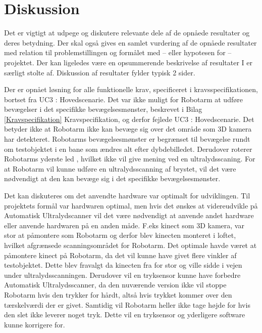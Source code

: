 \chapter{Diskussion}\label{kapitel_Diskussion}
Det er vigtigt at udpege og diskutere relevante dele af de opnåede resultater og deres betydning. Der skal også gives en samlet vurdering af de opnåede resultater med relation til problemstillingen og formålet med – eller hypotesen for – projektet. Der kan ligeledes være en opsummerende beskrivelse af resultater I er særligt stolte af. Diskussion af resultater fylder typisk 2 sider.

Der er opnået løsning for alle funktionelle krav, specificeret i kravsspecifikationen, bortset fra UC3 : Hovedscenarie. Det var ikke muligt for Robotarm at udføre bevægelser i det specifikke bevægelsesmønster, beskrevet i Bilag \ref{Kravspecifikation} Kravspecifikation, og derfor fejlede UC3 : Hovedscenarie. Det betyder ikke at Robotarm ikke kan bevæge sig over det område som 3D kamera har detekteret. Robotarms bevægelsesmønster er begrænset til bevægelse rundt om testobjektet i en bane som ændres alt efter dybdebilledet. Derudover roterer Robotarms yderste led , hvilket ikke vil give mening ved en ultralydsscaning. For at Robotarm vil kunne udføre en ultralydsscanning af brystet, vil det være nødvendigt at den kan bevæge sig i det specifikke bevægelsesmønster. 

Det kan diskuteres om det anvendte hardware var optimalt for udviklingen. Til projektets formål var hardwaren optimal, men hvis det ønskes at videreudvikle på Automatisk Ultralydscanner vil det være nødvendigt at anvende andet hardware eller anvende hardwaren på en anden måde. F.eks kinect som 3D kamera, var stor at påmontere som Robotarm og derfor blev kinecten monteret i loftet, hvilket afgrænsede scanningsområdet for Robotarm. Det optimale havde været at påmontere kinect på Robotarm, da det vil kunne have givet flere vinkler af testobjektet. Dette blev fravalgt da kinecten fra for stor og ville sidde i vejen under ultralydsscanningen. Derudover vil en tryksensor kunne have forbedre Automatisk Ultralydsscanner, da den nuværende version ikke vil stoppe Robotarm hvis den trykker for hårdt, altså hvis trykket kommer over den tærskelværdi der er givet. Samtidig vil Robotarm heller ikke tage højde for hvis den slet ikke leverer noget tryk. Dette vil en tryksensor og yderligere software kunne korrigere for. 

